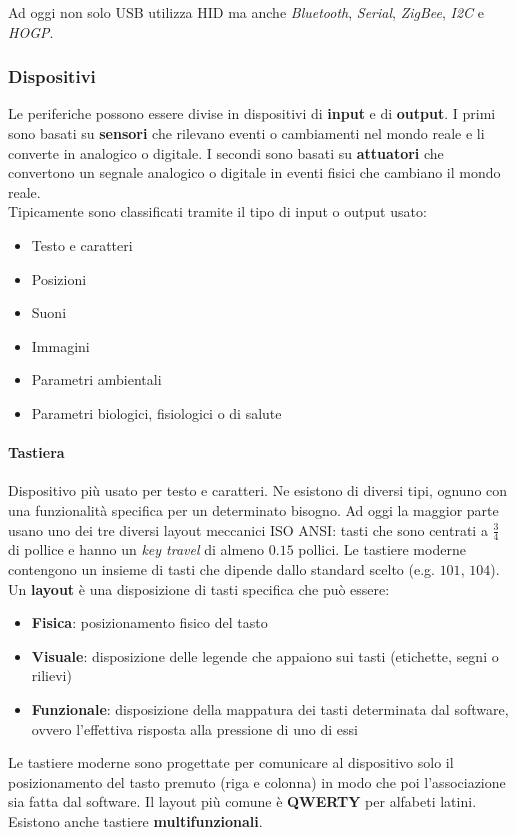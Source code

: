\begin{note}
	Ad oggi non solo USB utilizza HID ma anche \textit{Bluetooth}, \textit{Serial}, \textit{ZigBee}, \textit{I2C} e \textit{HOGP}.
\end{note}

\subsubsection{Dispositivi}
Le periferiche possono essere divise in dispositivi di \textbf{input} e di \textbf{output}. I primi sono basati su \textbf{sensori} che rilevano eventi o cambiamenti nel mondo reale e li converte in analogico o digitale. I secondi sono basati su \textbf{attuatori} che convertono un segnale analogico o digitale in eventi fisici che cambiano il mondo reale.\\

Tipicamente sono classificati tramite il tipo di input o output usato:
\begin{itemize}
	\item Testo e caratteri
	\item Posizioni
	\item Suoni
	\item Immagini
	\item Parametri ambientali
	\item Parametri biologici, fisiologici o di salute
\end{itemize}

\paragraph{Tastiera} Dispositivo più usato per testo e caratteri. Ne esistono di diversi tipi, ognuno con una funzionalità specifica per un determinato bisogno. Ad oggi la maggior parte usano uno dei tre diversi layout meccanici ISO ANSI: tasti che sono centrati a $\frac{3}{4}$ di pollice e hanno un \textit{key travel} di almeno $0.15$ pollici. Le tastiere  moderne contengono un insieme di tasti che dipende dallo standard scelto (e.g. $101$, $104$). 
Un \textbf{layout} è una disposizione di tasti specifica che può essere:
\begin{itemize}
	\item \textbf{Fisica}: posizionamento fisico del tasto
	\item \textbf{Visuale}: disposizione delle legende che appaiono sui tasti (etichette, segni o rilievi)
	\item \textbf{Funzionale}: disposizione della mappatura dei tasti determinata dal software, ovvero l'effettiva risposta alla pressione di uno di essi
\end{itemize}
Le tastiere moderne sono progettate per comunicare al dispositivo solo il posizionamento del tasto premuto (riga e colonna) in modo che poi l'associazione sia fatta dal software. Il layout più comune è \textbf{QWERTY} per alfabeti latini. Esistono anche tastiere \textbf{multifunzionali}.

